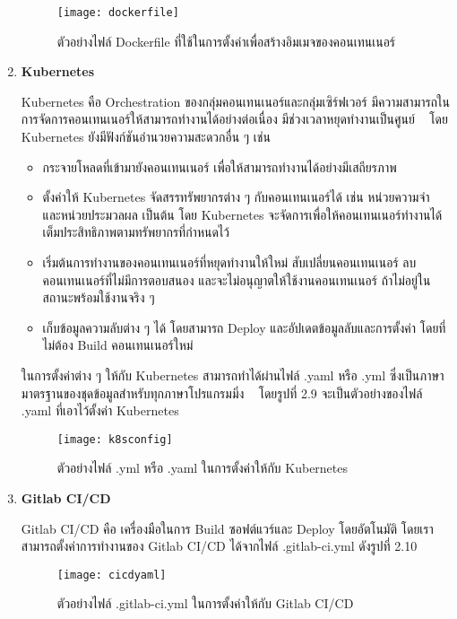 \begin{enumerate}
	\begin{figure}[!h]
		\centering
		\texttt{[image: dockerfile]}  
		\caption{ตัวอย่างไฟล์ Dockerfile ที่ใช้ในการตั้งค่าเพื่อสร้างอิมเมจของคอนเทนเนอร์}
		\label{Fig:dockerfile}
	\end{figure}
	
	\item \textbf{Kubernetes}
	
	Kubernetes คือ Orchestration ของกลุ่มคอนเทนเนอร์และกลุ่มเซิร์ฟเวอร์ มีความสามารถในการจัดการคอนเทนเนอร์ให้สามารถทำงานได้อย่างต่อเนื่อง มีช่วงเวลาหยุดทำงานเป็นศูนย์ 	 ~\cite{kubernetes} โดย Kubernetes ยังมีฟังก์ชันอำนวยความสะดวกอื่น ๆ เช่น
	\begin{itemize}
		\item กระจายโหลดที่เข้ามายังคอนเทนเนอร์ เพื่อให้สามารถทำงานได้อย่างมีเสถียรภาพ
		\item ตั้งค่าให้ Kubernetes จัดสรรทรัพยากรต่าง ๆ กับคอนเทนเนอร์ได้ เช่น หน่วยความจำ และหน่วยประมวลผล เป็นต้น โดย Kubernetes จะจัดการเพื่อให้คอนเทนเนอร์ทำงานได้เต็มประสิทธิภาพตามทรัพยากรที่กำหนดไว้
		\item เริ่มต้นการทำงานของคอนเทนเนอร์ที่หยุดทำงานให้ใหม่ สับเปลี่ยนคอนเทนเนอร์ ลบคอนเทนเนอร์ที่ไม่มีการตอบสนอง และจะไม่อนุญาตให้ใช้งานคอนเทนเนอร์ ถ้าไม่อยู่ในสถานะพร้อมใช้งานจริง ๆ
		\item เก็บข้อมูลความลับต่าง ๆ ได้ โดยสามารถ Deploy และอัปเดตข้อมูลลับและการตั้งค่า โดยที่ไม่ต้อง Build คอนเทนเนอร์ใหม่
	\end{itemize}
	ในการตั้งค่าต่าง ๆ ให้กับ Kubernetes สามารถทำได้ผ่านไฟล์ .yaml หรือ .yml ซึ่งเป็นภาษามาตรฐานของชุดข้อมูลสำหรับทุกภาษาโปรแกรมมิ่ง ~\cite{yaml} โดยรูปที่ 2.9 จะเป็นตัวอย่างของไฟล์ .yaml ที่เอาไว้ตั้งค่า Kubernetes
	
	\begin{figure}[!h]
		\centering
		\texttt{[image: k8sconfig]}  
		\caption{ตัวอย่างไฟล์ .yml หรือ .yaml ในการตั้งค่าให้กับ Kubernetes}
		\label{Fig:cicdyaml}
	\end{figure}
	
	\item \textbf{Gitlab CI/CD}
	
	Gitlab CI/CD คือ เครื่องมือในการ Build ซอฟต์แวร์และ Deploy โดยอัตโนมัติ โดยเราสามารถตั้งค่าการทำงานของ Gitlab CI/CD ได้จากไฟล์ .gitlab-ci.yml ดังรูปที่ 2.10 ~\cite{gitlabcicd} 
	
	\begin{figure}[!h]
		\centering
		\texttt{[image: cicdyaml]}  
		\caption{ตัวอย่างไฟล์ .gitlab-ci.yml ในการตั้งค่าให้กับ Gitlab CI/CD}
		\label{Fig:cicdyaml}
	\end{figure}		
\end{enumerate}


